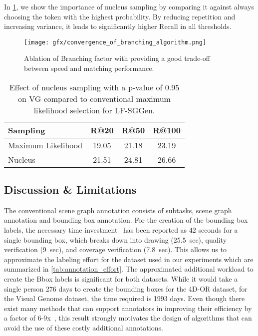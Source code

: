 \documentclass[10pt,twocolumn,letterpaper]{article}
\begin{document}
In \cref{tab:sampling_results}, we show the importance of nucleus sampling by comparing it against always choosing the token with the highest probability. By reducing repetition and increasing variance, it leads to significantly higher Recall in all thresholds.

\begin{figure}[t]
  \centering

   \texttt{[image: gfx/convergence\_of\_branching\_algorithm.png]}

   \caption{Ablation of Branching factor with  providing a good trade-off between speed and matching performance.}
   \label{fig:convergence_20}
\end{figure}

\begin{table}
  \centering
  \begin{tabular}{l c c c}
  \toprule
Sampling & R@20 & R@50 & R@100 \\
    \midrule
    Maximum Likelihood & 19.05 & 21.18 & 23.19 \\
    Nucleus \cite{holtzman_curious_2020} & 21.51 & 24.81 & 26.66\\
    \bottomrule
  \end{tabular}
  \caption{Effect of nucleus sampling with a p-value of 0.95 on VG compared to conventional maximum likelihood selection for LF-SGGen.}
  \label{tab:sampling_results}
\end{table}


\subsection{Discussion \& Limitations}
The conventional scene graph annotation consists of subtasks, scene graph annotation and bounding box annotation. For the creation of the bounding box labels, the necessary time investment~\cite{su_crowdsourcing_2012} has been reported as 42 seconds for a single bounding box, which breaks down into drawing (25.5~sec), quality verification (9~sec), and coverage verification (7.8~sec).
This allows us to approximate the labeling effort for the dataset used in our experiments which are summarized in \cref{tab:annotation_effort}.
The approximated additional workload to create the Bbox labels is significant for both datasets. While it would take a single person 276 days to create the bounding boxes for the 4D-OR dataset, for the Visual Genome dataset, the time required is 1993 days. Even though there exist many methods that can support annotators in improving their efficiency by a factor of 6-9x~\cite{su_crowdsourcing_2012}, this result strongly motivates the design of algorithms that can avoid the use of these costly additional annotations.
\end{document}

